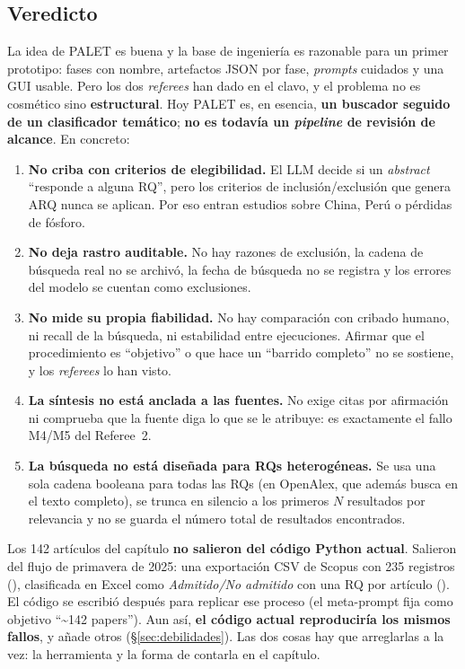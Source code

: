 \documentclass[11pt,a4paper]{article}
\begin{document}
\subsection*{Veredicto}

La idea de PALET es buena y la base de ingeniería es razonable para un primer prototipo: fases con nombre, artefactos JSON por fase, \emph{prompts} cuidados y una GUI usable. Pero los dos \emph{referees} han dado en el clavo, y el problema no es cosmético sino \textbf{estructural}. Hoy PALET es, en esencia, \textbf{un buscador seguido de un clasificador temático}; \textbf{no es todavía un \emph{pipeline} de revisión de alcance}. En concreto:

\begin{enumerate}
  \item \textbf{No criba con criterios de elegibilidad.} El LLM decide si un \emph{abstract} ``responde a alguna RQ'', pero los criterios de inclusión/exclusión que genera ARQ nunca se aplican. Por eso entran estudios sobre China, Perú o pérdidas de fósforo.
  \item \textbf{No deja rastro auditable.} No hay razones de exclusión, la cadena de búsqueda real no se archivó, la fecha de búsqueda no se registra y los errores del modelo se cuentan como exclusiones.
  \item \textbf{No mide su propia fiabilidad.} No hay comparación con cribado humano, ni recall de la búsqueda, ni estabilidad entre ejecuciones. Afirmar que el procedimiento es ``objetivo'' o que hace un ``barrido completo'' no se sostiene, y los \emph{referees} lo han visto.
  \item \textbf{La síntesis no está anclada a las fuentes.} No exige citas por afirmación ni comprueba que la fuente diga lo que se le atribuye: es exactamente el fallo M4/M5 del Referee~2.
  \item \textbf{La búsqueda no está diseñada para RQs heterogéneas.} Se usa una sola cadena booleana para todas las RQs (en OpenAlex, que además busca en el texto completo), se trunca en silencio a los primeros $N$ resultados por relevancia y no se guarda el número total de resultados encontrados.
\end{enumerate}

\begin{nota}
Los 142 artículos del capítulo \textbf{no salieron del código Python actual}. Salieron del flujo de primavera de 2025: una exportación CSV de Scopus con 235 registros (), clasificada en Excel como \emph{Admitido/No admitido} con una RQ por artículo (). El código se escribió después para replicar ese proceso (el meta-prompt fija como objetivo ``\textasciitilde142 papers''). Aun así, \textbf{el código actual reproduciría los mismos fallos}, y añade otros (§\ref{sec:debilidades}). Las dos cosas hay que arreglarlas a la vez: la herramienta y la forma de contarla en el capítulo.
\end{nota}
\end{document}
